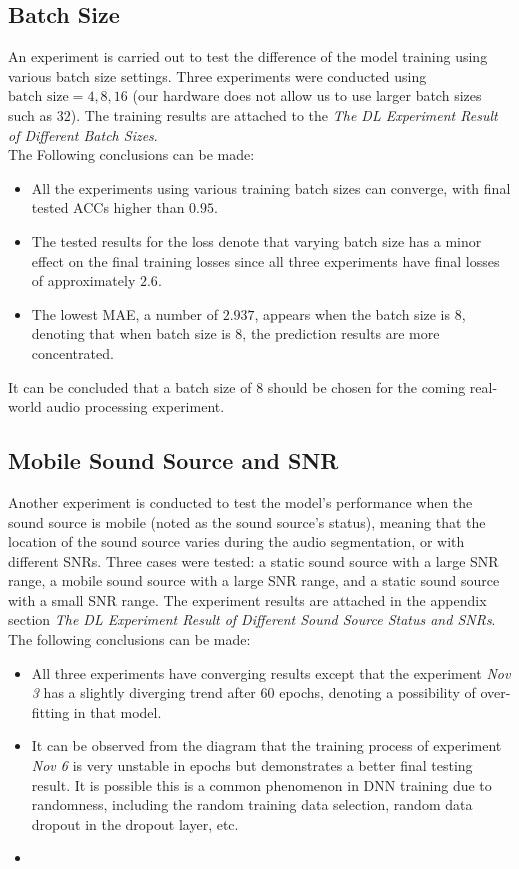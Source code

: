 \subsection*{Batch Size}
An experiment is carried out to test the difference of the model training using various batch size settings. Three experiments were conducted using \(\text{batch size} = 4,8,16\) (our hardware does not allow us to use larger batch sizes such as \(32\)). The training results are attached to the \textit{The DL Experiment Result of Different Batch Sizes}.\\
The Following conclusions can be made:
\begin{itemize}
    \item All the experiments using various training batch sizes can converge, with final tested ACCs higher than \(0.95\).
    \item The tested results for the loss denote that varying batch size has a minor effect on the final training losses since all three experiments have final losses of approximately \(2.6\).
    \item The lowest MAE, a number of \(2.937\), appears when the batch size is \(8\), denoting that when batch size is \(8\), the prediction results are more concentrated.
\end{itemize}
It can be concluded that a batch size of \(8\) should be chosen for the coming real-world audio processing experiment.

\subsection*{Mobile Sound Source and SNR}
Another experiment is conducted to test the model's performance when the sound source is mobile (noted as the sound source's status), meaning that the location of the sound source varies during the audio segmentation, or with different SNRs. Three cases were tested: a static sound source with a large SNR range, a mobile sound source with a large SNR range, and a static sound source with a small SNR range. The experiment results are attached in the appendix section \textit{The DL Experiment Result of Different Sound Source Status and SNRs}. \\
The following conclusions can be made:
\begin{itemize}
    \item All three experiments have converging results except that the experiment \textit{Nov 3} has a slightly diverging trend after \(60\) epochs, denoting a possibility of over-fitting in that model. 
    \item It can be observed from the diagram that the training process of experiment \textit{Nov 6} is very unstable in epochs but demonstrates a better final testing result. It is possible this is a common phenomenon in DNN training due to randomness, including the random training data selection, random data dropout in the dropout layer, etc. 
    \item 
\end{itemize}

